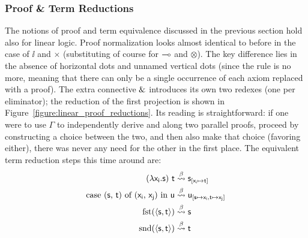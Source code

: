 \subsubsection{Proof \& Term Reductions}
The notions of proof and term equivalence discussed in the previous section hold also for linear logic.
Proof normalization looks almost identical to before in the case of $\ii$ and $\times$ (substituting of course for $\li$ and $\otimes$).
The key difference lies in the absence of horizontal dots and unnamed vertical dots (since the \Contraction{} rule is no more, meaning that there can only be a single occurrence of each axiom replaced with a proof).
The extra connective ${\&}$ introduces its own two redexes (one per eliminator); the reduction of the first projection is shown in Figure~\ref{figure:linear_proof_reductions}. 
Its reading is straightforward: if one were to use $\Gamma$ to independently derive  and  along two parallel proofs, proceed by constructing a choice between the two, and then also make that choice (favoring either), there was never any need for the other in the first place.
The equivalent term reduction steps this time around are:
\begin{align*}
(\mathsf{\lambda x_i .s})~\mathsf{t} & \overset{\beta}{\leadsto} \mathsf{s}_{[\mathsf{x_i } \mapsto \mathsf{t}]}\\
\textrm{case (\ensuremath{\mathsf{s}}, \ensuremath{\mathsf{t}}) of (\ensuremath{\mathsf{x_i }}, \ensuremath{\mathsf{x_j}}) in \ensuremath{\mathsf{u}}} & \overset{\beta}{\leadsto} \mathsf{u_{[\mathsf{s} \mapsto \mathsf{x_i }, \mathsf{t} \mapsto \mathsf{x_j}]}}\\
\textrm{fst}(\langle\mathsf{s},\mathsf{t}\rangle) & \overset{\beta}{\leadsto} \mathsf{s}\\
\textrm{snd}(\langle\mathsf{s},\mathsf{t}\rangle) & \overset{\beta}{\leadsto} \mathsf{t}\\
\end{align*}


